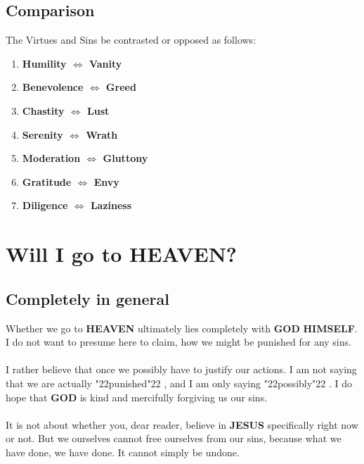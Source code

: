 \documentclass[12pt,a5paper]{article}
\newcommand{\God}[0]{\textbf{GOD}}
\newcommand{\Heaven}[0]{\textbf{HEAVEN}}
\newcommand{\Himself}[0]{\textbf{HIMSELF}}
\newcommand{\Jesus}[0]{\textbf{JESUS}}
\newcommand{\q}[1]{\char"22{#1}\char"22 }
\begin{document}
	\subsection{Comparison}
		The Virtues and Sins be contrasted or opposed as follows:
		\begin{enumerate}
			\item \textbf{Humility $\Longleftrightarrow$ Vanity}
			\item \textbf{Benevolence $\Longleftrightarrow$ Greed}
			\item \textbf{Chastity $\Longleftrightarrow$ Lust}
			\item \textbf{Serenity $\Longleftrightarrow$ Wrath}
			\item \textbf{Moderation $\Longleftrightarrow$ Gluttony}
			\item \textbf{Gratitude $\Longleftrightarrow$ Envy}
			\item \textbf{Diligence $\Longleftrightarrow$ Laziness}
		\end{enumerate}

	\newpage
	\section{Will I go to {\Heaven}?}
	
	\subsection{Completely in general}
		Whether we go to {\Heaven} ultimately lies completely with {\God} {\Himself}.
		I do not want to presume here to claim,
		how we might be punished for any sins.
		\\
		\\
		I rather believe that once we possibly have to justify our actions.
		I am not saying that we are actually \q{punished},
		and I am only saying \q{possibly}.
		I do hope that {\God} is kind and mercifully forgiving us our sins.
		\\
		\\
		It is not about whether you,
		dear reader,
		believe in {\Jesus} specifically right now or not.
		But we ourselves cannot free ourselves from our sins,
		because what we have done,
		we have done.
		It cannot simply be undone.
\end{document}
